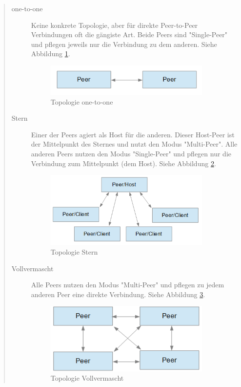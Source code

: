 \begin{quote}
  \begin{description}
  \item[one-to-one]
  Keine konkrete Topologie, aber für direkte Peer-to-Peer Verbindungen oft die gängiste Art. Beide Peers sind "Single-Peer" und pflegen jeweils nur die Verbindung zu dem anderen. 
  Siehe Abbildung \ref{backfig3}.
  \begin{figure}[htH]
  \centering
  \includegraphics[width=0.9\textwidth]{backend/Topologie_1v1.PNG}
  \caption{Topologie one-to-one}
  \label{backfig3}
  \end{figure}

  \item[Stern]
  Einer der Peers agiert als Host für die anderen. Dieser Host-Peer ist der Mittelpunkt des Sternes und nutzt den Modus "Multi-Peer". Alle anderen Peers nutzen den Modus "Single-Peer" und pflegen nur die Verbindung zum Mittelpunkt (dem Host).
  Siehe Abbildung \ref{backfig4}.
  \begin{figure}[htH]
  \centering
  \includegraphics[width=0.9\textwidth]{backend/Topologie_4v1.PNG}
  \caption{Topologie Stern}
  \label{backfig4}
  \end{figure}

  \item[Vollvermascht]
  Alle Peers nutzen den Modus "Multi-Peer" und pflegen zu jedem anderen Peer eine direkte Verbindung.
  Siehe Abbildung \ref{backfig5}.
  \begin{figure}[htH]
  \centering
  \includegraphics[width=0.9\textwidth]{backend/Topologie_ava.PNG}
  \caption{Topologie Vollvermascht}
  \label{backfig5}
  \end{figure}
  \end{description}
\end{quote}


